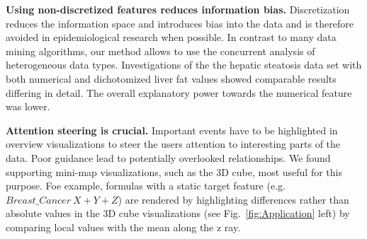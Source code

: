\documentclass[journal]{style/vgtc} 			          %
\newcommand{\com}[1]{\textcolor{orange}{\uline{#1}}}
\begin{document}
\textbf{Using non-discretized features reduces information bias.}
Discretization reduces the information space and introduces bias into the data and is therefore avoided in epidemiological research when possible.
In contrast to many data mining algorithms, our method allows to use the concurrent analysis of heterogeneous data types.
Investigations of the the hepatic steatosis data set with both numerical and dichotomized liver fat values showed comparable results differing in detail.%
The overall explanatory power towards the numerical feature was lower.

\textbf{Attention steering is crucial.}
Important events have to be highlighted in overview visualizations to steer the users attention to interesting parts of the data.
Poor guidance lead to potentially overlooked relationships.
We found supporting mini-map visualizations, such as the 3D cube, most useful for this purpose.
Foe example, formulas with a static target feature (e.g. $Breast\_Cancer ~ X + Y + Z$) are rendered by highlighting differences rather than absolute values in the 3D cube visualizations (see Fig.~\ref{fig:Application} left) by comparing local values with the mean along the z ray.



\end{document}
